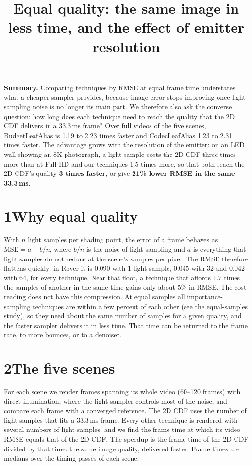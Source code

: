 \documentclass[10pt]{article}
\title{\vspace{-1.6em}Equal quality: the same image in less time, and the effect of emitter resolution}
\author{}
\date{\vspace{-2.4em}}
\begin{document}
\maketitle
\vspace{-1.0em}

\textbf{Summary.} Comparing techniques by RMSE at equal frame time understates what a cheaper sampler provides, because image error stops improving once light-sampling noise is no longer its main part. We therefore also ask the converse question: how long does each technique need to reach the quality that the 2D CDF delivers in a 33.3\,ms frame? Over full videos of the five scenes, BudgetLeafAlias is 1.19 to 2.23 times faster and CodecLeafAlias 1.23 to 2.31 times faster. The advantage grows with the resolution of the emitter: on an LED wall showing an 8K photograph, a light sample costs the 2D CDF three times more than at Full HD and our techniques 1.5 times more, so that both reach the 2D CDF's quality \textbf{3 times faster}, or give \textbf{21\% lower RMSE in the same 33.3\,ms}.

\section*{1\quad Why equal quality}

With $n$ light samples per shading point, the error of a frame behaves as $\mathrm{MSE} = a + b/n$, where $b/n$ is the noise of light sampling and $a$ is everything that light samples do not reduce at the scene's samples per pixel. The RMSE therefore flattens quickly: in Rover it is 0.090 with 1 light sample, 0.045 with 32 and 0.042 with 64, for every technique. Near that floor, a technique that affords 1.7 times the samples of another in the same time gains only about 5\% in RMSE. The cost reading does not have this compression. At equal samples all importance-sampling techniques are within a few percent of each other (see the equal-samples study), so they need about the same number of samples for a given quality, and the faster sampler delivers it in less time. That time can be returned to the frame rate, to more bounces, or to a denoiser.

\section*{2\quad The five scenes}

For each scene we render frames spanning its whole video (60--120 frames) with direct illumination, where the light sampler controls most of the noise, and compare each frame with a converged reference. The 2D CDF uses the number of light samples that fits a 33.3\,ms frame. Every other technique is rendered with several numbers of light samples, and we find the frame time at which its video RMSE equals that of the 2D CDF. The speedup is the frame time of the 2D CDF divided by that time: the same image quality, delivered faster. Frame times are medians over the timing passes of each scene.
\end{document}
